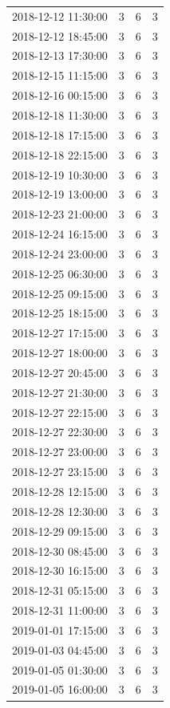 \begin{tabular}{lrrr}
2018-12-12 11:30:00 & 3 & 6 & 3 \\
2018-12-12 18:45:00 & 3 & 6 & 3 \\
2018-12-13 17:30:00 & 3 & 6 & 3 \\
2018-12-15 11:15:00 & 3 & 6 & 3 \\
2018-12-16 00:15:00 & 3 & 6 & 3 \\
2018-12-18 11:30:00 & 3 & 6 & 3 \\
2018-12-18 17:15:00 & 3 & 6 & 3 \\
2018-12-18 22:15:00 & 3 & 6 & 3 \\
2018-12-19 10:30:00 & 3 & 6 & 3 \\
2018-12-19 13:00:00 & 3 & 6 & 3 \\
2018-12-23 21:00:00 & 3 & 6 & 3 \\
2018-12-24 16:15:00 & 3 & 6 & 3 \\
2018-12-24 23:00:00 & 3 & 6 & 3 \\
2018-12-25 06:30:00 & 3 & 6 & 3 \\
2018-12-25 09:15:00 & 3 & 6 & 3 \\
2018-12-25 18:15:00 & 3 & 6 & 3 \\
2018-12-27 17:15:00 & 3 & 6 & 3 \\
2018-12-27 18:00:00 & 3 & 6 & 3 \\
2018-12-27 20:45:00 & 3 & 6 & 3 \\
2018-12-27 21:30:00 & 3 & 6 & 3 \\
2018-12-27 22:15:00 & 3 & 6 & 3 \\
2018-12-27 22:30:00 & 3 & 6 & 3 \\
2018-12-27 23:00:00 & 3 & 6 & 3 \\
2018-12-27 23:15:00 & 3 & 6 & 3 \\
2018-12-28 12:15:00 & 3 & 6 & 3 \\
2018-12-28 12:30:00 & 3 & 6 & 3 \\
2018-12-29 09:15:00 & 3 & 6 & 3 \\
2018-12-30 08:45:00 & 3 & 6 & 3 \\
2018-12-30 16:15:00 & 3 & 6 & 3 \\
2018-12-31 05:15:00 & 3 & 6 & 3 \\
2018-12-31 11:00:00 & 3 & 6 & 3 \\
2019-01-01 17:15:00 & 3 & 6 & 3 \\
2019-01-03 04:45:00 & 3 & 6 & 3 \\
2019-01-05 01:30:00 & 3 & 6 & 3 \\
2019-01-05 16:00:00 & 3 & 6 & 3 \\

\end{tabular}
